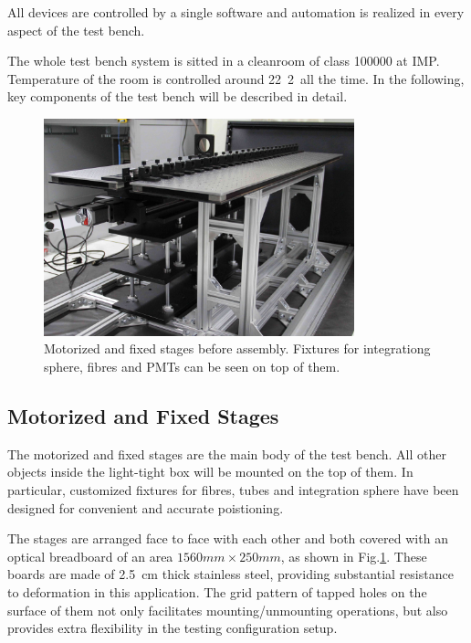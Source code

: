 \documentclass[5p, times]{elsarticle}
\begin{document}
All devices are controlled by a single software and automation is realized in every aspect of the test bench.

The whole test bench system is sitted in a cleanroom of class 100000 at IMP.
Temperature of the room is controlled around 22\textpm~2\textcelsius~all the time.
In the following, key components of the test bench will be described in detail.

\begin{figure}
 \centering
 \includegraphics[width=90mm]{stage1_crop}
\caption{Motorized and fixed stages before assembly.
Fixtures for integrationg sphere, fibres and PMTs can be seen on top of them.}
\label{fig:stages}
\end{figure} 

\subsection{Motorized and Fixed Stages}
\label{sec:stages}

The motorized and fixed stages are the main body of the test bench.
All other objects inside the light-tight box will be mounted on the top of them.
In particular, customized fixtures for fibres, tubes and integration sphere have been designed for convenient and accurate poistioning.

The stages are arranged face to face with each other and both covered with an optical breadboard of an area $1560mm\times250mm$, as shown in Fig.\ref{fig:stages}.
These boards are made of \SI{2.5}{cm} thick stainless steel, providing substantial resistance to deformation in this application.
The grid pattern of tapped holes on the surface of them not only facilitates mounting/unmounting operations, but also provides extra flexibility in the testing configuration setup.
\end{document}
